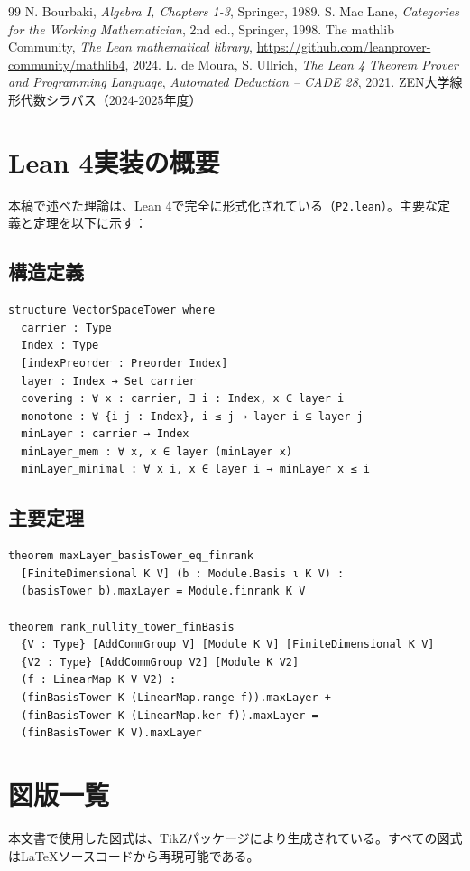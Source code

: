 \documentclass[a4paper,11pt]{ltjsarticle}
\theoremstyle{definition}
\begin{document}
\begin{thebibliography}{99}
 N. Bourbaki, \textit{Algebra I, Chapters 1-3}, Springer, 1989.
 S. Mac Lane, \textit{Categories for the Working Mathematician}, 2nd ed., Springer, 1998.
 The mathlib Community, \textit{The Lean mathematical library}, \url{https://github.com/leanprover-community/mathlib4}, 2024.
 L. de Moura, S. Ullrich, \textit{The Lean 4 Theorem Prover and Programming Language}, \textit{Automated Deduction – CADE 28}, 2021.
 ZEN大学線形代数シラバス（2024-2025年度）
\end{thebibliography}

\appendix

\section{Lean 4実装の概要}

本稿で述べた理論は、Lean 4で完全に形式化されている（\texttt{P2.lean}）。主要な定義と定理を以下に示す：

\subsection{構造定義}

\begin{verbatim}
structure VectorSpaceTower where
  carrier : Type
  Index : Type
  [indexPreorder : Preorder Index]
  layer : Index → Set carrier
  covering : ∀ x : carrier, ∃ i : Index, x ∈ layer i
  monotone : ∀ {i j : Index}, i ≤ j → layer i ⊆ layer j
  minLayer : carrier → Index
  minLayer_mem : ∀ x, x ∈ layer (minLayer x)
  minLayer_minimal : ∀ x i, x ∈ layer i → minLayer x ≤ i
\end{verbatim}

\subsection{主要定理}

\begin{verbatim}
theorem maxLayer_basisTower_eq_finrank
  [FiniteDimensional K V] (b : Module.Basis ι K V) :
  (basisTower b).maxLayer = Module.finrank K V

theorem rank_nullity_tower_finBasis
  {V : Type} [AddCommGroup V] [Module K V] [FiniteDimensional K V]
  {V2 : Type} [AddCommGroup V2] [Module K V2]
  (f : LinearMap K V V2) :
  (finBasisTower K (LinearMap.range f)).maxLayer +
  (finBasisTower K (LinearMap.ker f)).maxLayer =
  (finBasisTower K V).maxLayer
\end{verbatim}

\section{図版一覧}

本文書で使用した図式は、TikZパッケージにより生成されている。すべての図式は\LaTeX{}ソースコードから再現可能である。
\end{document}
